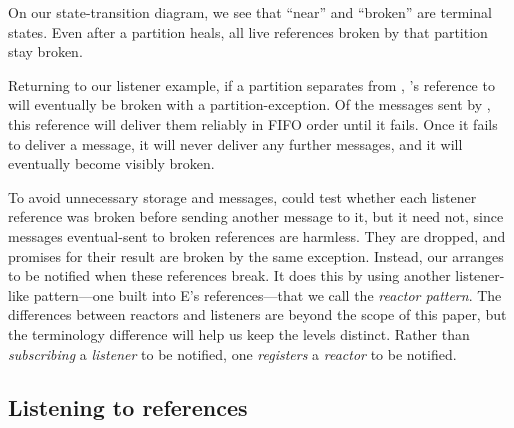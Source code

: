 \documentclass{llncs}
\begin{document}
On our state-transition diagram, we see that ``near'' and ``broken''
are terminal states. Even after a partition heals, all live references
broken by that partition stay broken.

Returning to our listener example, if a partition separates 
from , 's reference to  will eventually be
broken with a partition-exception. Of the 
messages sent by , this reference will deliver them reliably
in FIFO order until it fails. Once it fails to deliver a message, it
will never deliver any further messages, and it will eventually become
visibly broken.

To avoid unnecessary storage and messages,  could test
whether each listener reference was broken before sending another
 message to it, but it need not, since messages
eventual-sent to broken references are harmless. They are dropped, and
promises for their result are broken by the same exception. Instead,
our  arranges to be notified when these references
break. It does this by using another listener-like pattern---one built
into E's references---that we call the \emph{reactor pattern}. The
differences between reactors and listeners are beyond the scope of
this paper, but the terminology difference will help us keep the
levels distinct. Rather than \emph{subscribing} a \emph{listener} to
be notified, one \emph{registers} a \emph{reactor} to be notified.

\subsection{Listening to references}
\end{document}
